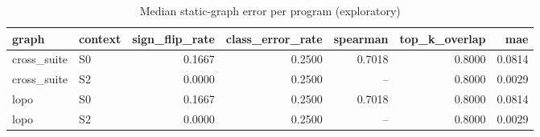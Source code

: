 \begin{table}[t]
\centering
\caption{Median static-graph error per program (exploratory)}
\label{tab:v3-1-static-graph-error}
\begin{tabular}{llrrrrr}
\toprule
graph & context & sign\_flip\_rate & class\_error\_rate & spearman & top\_k\_overlap & mae \\
\midrule
cross\_suite & S0 & 0.1667 & 0.2500 & 0.7018 & 0.8000 & 0.0814 \\
cross\_suite & S2 & 0.0000 & 0.2500 & -- & 0.8000 & 0.0029 \\
lopo & S0 & 0.1667 & 0.2500 & 0.7018 & 0.8000 & 0.0814 \\
lopo & S2 & 0.0000 & 0.2500 & -- & 0.8000 & 0.0029 \\
\bottomrule
\end{tabular}
\end{table}
